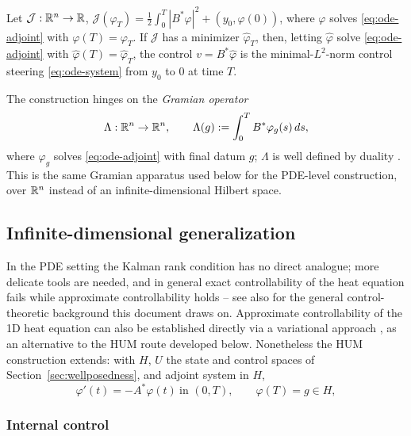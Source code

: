 \begin{theorem}
  \label{thm:ode-hum}
  Let $\mathcal{J}: \mathbb{R}^n \to \mathbb{R}$,
  $\mathcal{J}(\varphi_T) = \tfrac12\int_0^T |B^*\varphi|^2 + (y_0,\varphi(0))$,
  where $\varphi$ solves \eqref{eq:ode-adjoint} with $\varphi(T)=\varphi_T$.
  If $\mathcal{J}$ has a minimizer $\hat\varphi_T$, then, letting $\hat\varphi$
  solve \eqref{eq:ode-adjoint} with $\hat\varphi(T)=\hat\varphi_T$, the control
  $v = B^*\hat\varphi$ is the minimal-$L^2$-norm control steering
  \eqref{eq:ode-system} from $y_0$ to $0$ at time $T$.
\end{theorem}

The construction hinges on the \emph{Gramian operator}
\begin{equation}
  \label{eq:ode-gramian}
  \Lambda: \mathbb{R}^n \to \mathbb{R}^n, \qquad
  \Lambda(g) := \int_0^T B^*\varphi_g(s)\,ds,
\end{equation}
where $\varphi_g$ solves \eqref{eq:ode-adjoint} with final datum $g$; $\Lambda$
is well defined by duality \citep{boyer2013penalised}. This is the same
Gramian apparatus used below for the PDE-level construction, over $\mathbb{R}^n$
instead of an infinite-dimensional Hilbert space.

\subsection{Infinite-dimensional generalization}
\label{ssec:hum-infinite}

In the PDE setting the Kalman rank condition has no direct analogue; more
delicate tools are needed, and in general exact controllability of the heat
equation fails while approximate controllability holds
\citep{zuazua2002controllability} -- see also \citet{coron2007control,
zabczyk2020mathematical} for the general control-theoretic background this
document draws on. Approximate controllability of the 1D heat equation can
also be established directly via a variational approach
\citep{fabre1995approximate}, as an alternative to the HUM route developed
below. Nonetheless the HUM construction extends: with $H$, $U$ the state and
control spaces of Section~\ref{sec:wellposedness}, and adjoint system in $H$,
\begin{equation}
  \label{eq:pde-adjoint}
  \varphi'(t) = -A^*\varphi(t) \ \text{in } (0,T), \qquad \varphi(T) = g \in H,
\end{equation}

\subsubsection*{Internal control}

